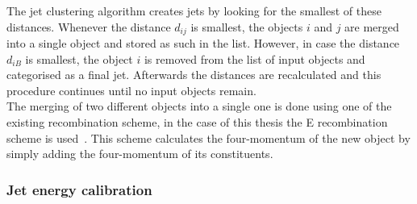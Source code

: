 The jet clustering algorithm creates jets by looking for the smallest of these distances. Whenever the distance $d_{ij}$ is smallest, the objects $i$ and $j$ are merged into a single object and stored as such in the list. However, in case the distance $d_{iB}$ is smallest, the object $i$ is removed from the list of input objects and categorised as a final jet. Afterwards the distances are recalculated and this procedure continues until no input objects remain.
\\
The merging of two different objects into a single one is done using one of the existing recombination scheme, in the case of this thesis the E recombination scheme is used~\cite{}. This scheme calculates the four-momentum of the new object by simply adding the four-momentum of its constituents. %

\subsubsection*{Jet energy calibration}

